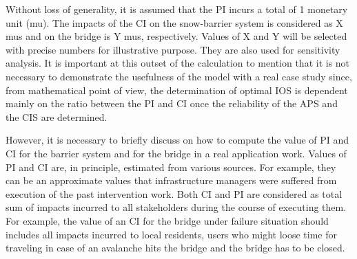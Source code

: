 \documentclass[fleqn]{article}
\begin{document}
Without loss of generality, it is assumed that the PI incurs a total of 1 monetary unit (mu). The impacts of the CI on the snow-barrier system is considered as X mus and on the bridge is Y mus, respectively. Values of X and Y will be selected with precise numbers for illustrative purpose. They are also used for sensitivity analysis. It is important at this outset of the calculation to mention that it is not necessary to demonstrate the usefulness of the model with a real case study since, from mathematical point of view, the determination of optimal IOS is dependent mainly on the ratio between the PI and CI once the reliability of the APS and the CIS are determined. 

However, it is necessary to briefly discuss on how to compute the value of PI and CI for the barrier system and for the bridge in a real application work. Values of PI and CI are, in principle, estimated from various sources. For example, they can be an approximate values that infrastructure managers were suffered from execution of the past intervention work. Both CI and PI are considered as total sum of impacts incurred to all stakeholders during the course of executing them. For example, the value of an CI for the bridge under failure situation should includes all impacts incurred to local residents, users who might loose time for traveling in case of an avalanche hits the bridge and the bridge has to be closed. 


\end{document}
